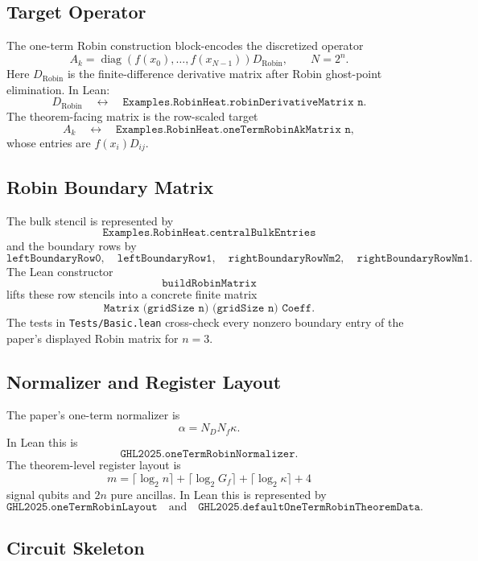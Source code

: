 \subsection{Target Operator}

The one-term Robin construction block-encodes the discretized operator
\[
  A_k = \operatorname{diag}(f(x_0),\ldots,f(x_{N-1})) D_{\mathrm{Robin}},
  \qquad N = 2^n .
\]
Here \(D_{\mathrm{Robin}}\) is the finite-difference derivative matrix after
Robin ghost-point elimination.  In Lean:
\[
  D_{\mathrm{Robin}}
  \quad\leftrightarrow\quad
  \texttt{Examples.RobinHeat.robinDerivativeMatrix n}.
\]
The theorem-facing matrix is the row-scaled target
\[
  A_k
  \quad\leftrightarrow\quad
  \texttt{Examples.RobinHeat.oneTermRobinAkMatrix n},
\]
whose entries are \(f(x_i)D_{ij}\).

\subsection{Robin Boundary Matrix}

The bulk stencil is represented by
\[
  \texttt{Examples.RobinHeat.centralBulkEntries}
\]
and the boundary rows by
\[
  \texttt{leftBoundaryRow0},\quad
  \texttt{leftBoundaryRow1},\quad
  \texttt{rightBoundaryRowNm2},\quad
  \texttt{rightBoundaryRowNm1}.
\]
The Lean constructor
\[
  \texttt{buildRobinMatrix}
\]
lifts these row stencils into a concrete finite matrix
\[
  \texttt{Matrix (gridSize n) (gridSize n) Coeff}.
\]
The tests in \texttt{Tests/Basic.lean} cross-check every nonzero boundary entry
of the paper's displayed Robin matrix for \(n=3\).

\subsection{Normalizer and Register Layout}

The paper's one-term normalizer is
\[
  \alpha = N_D N_f \kappa.
\]
In Lean this is
\[
  \texttt{GHL2025.oneTermRobinNormalizer}.
\]
The theorem-level register layout is
\[
  m = \lceil \log_2 n\rceil
    + \lceil \log_2 G_f\rceil
    + \lceil \log_2 \kappa\rceil
    + 4
\]
signal qubits and \(2n\) pure ancillas.  In Lean this is represented by
\[
  \texttt{GHL2025.oneTermRobinLayout}
  \quad\text{and}\quad
  \texttt{GHL2025.defaultOneTermRobinTheoremData}.
\]

\subsection{Circuit Skeleton}

